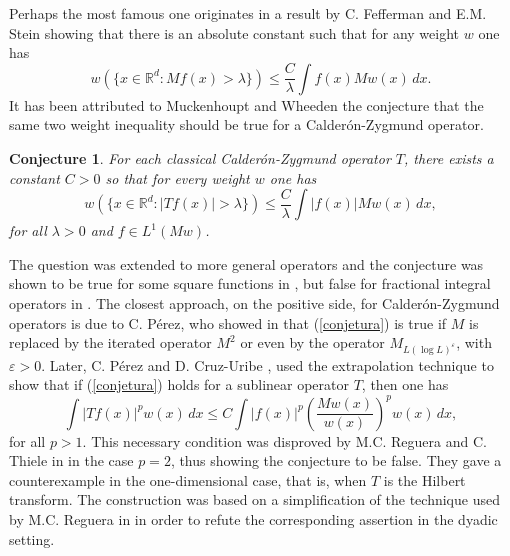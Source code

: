 \documentclass[11pt]{amsart}
\newtheorem{conjecture}{Conjecture}
\theoremstyle{definition}
\begin{document}
\bigskip

Perhaps the most famous one originates in a result by C. Fefferman and E.M. Stein \cite{FeffermanStein} showing that there is an absolute constant such that for any weight $w$ one has
\begin{equation}\label{desigualdad.feffermanstein}
w\left(\{x\in{\mathbb{R}}^d: Mf(x)>\lambda\}\right) \leq \frac C\lambda\int f(x) Mw(x)\,dx.
\end{equation}
It has been attributed to Muckenhoupt and Wheeden the conjecture that the same two weight inequality should be true for a Calder\'on-Zygmund operator.

\bigskip

\begin{conjecture}\label{conj1} For each classical Calder\'on-Zygmund operator $T$,  there exists a constant $C>0$ so that for every weight $w$ one has
\begin{equation}\label{conjetura}
w\left(\{x\in{\mathbb{R}}^d: |Tf(x)|>\lambda\}\right) \leq \frac C\lambda\int |f(x)| Mw(x)\,dx,
\end{equation}
for all $\lambda>0$ and $f\in L^1(Mw)$.
\end{conjecture}

\bigskip

The question was extended to more general operators and the conjecture was shown to be true for some square functions in \cite{ChanilloWheeden}, but false for fractional integral operators in \cite{CarroPerezSoriaSoria}. The closest approach, on the positive side, for Calder\'on-Zygmund operators is due to C. P\'erez, who showed in \cite{Perez1} that (\ref{conjetura}) is true if $M$ is replaced by the iterated operator $M^2$ or even by the operator $M_{L(\log L)^{\varepsilon}}$, with ${\varepsilon}>0$. Later, C. P\'erez and D. Cruz-Uribe \cite{CUCP2}, used the extrapolation technique to show that if (\ref{conjetura}) holds for a sublinear operator $T$, then one has
\begin{equation}\label{cond.perez.cu}
\int |Tf(x)|^p w(x)\,dx \leq C \int |f(x)|^p\left(\frac{Mw(x)}{w(x)}\right)^p w(x)\,dx,
\end{equation}
for all $p>1$. This necessary condition was disproved by M.C. Reguera and C. Thiele in \cite{RegueraThiele} in the case $p=2$, thus showing the conjecture to be false. They gave a counterexample in the one-dimensional case, that is, when $T$ is the Hilbert transform. The construction was based on a simplification of the technique used by M.C. Reguera in \cite{Reguera} in order to refute the corresponding assertion in the dyadic setting. 
\end{document}
